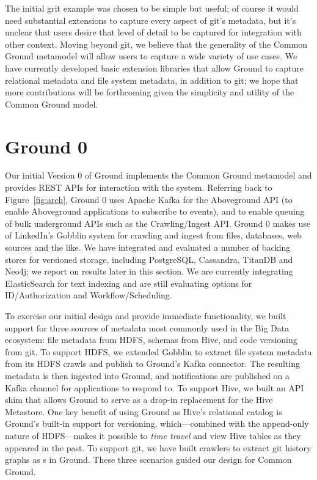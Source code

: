 \documentclass{sig-alternate}
\begin{document}
The initial grit example was chosen to be simple but useful; of course it would need substantial extensions to capture every aspect of git's metadata, but it's unclear that users desire that level of detail to be captured for integration with other context. Moving beyond git, we believe that the generality of the Common Ground metamodel will allow users to capture a wide variety of use cases. We have currently developed basic extension libraries that allow Ground to capture relational metadata and file system metadata, in addition to git; we hope that more contributions will be forthcoming given the simplicity and utility of the Common Ground model.

\section{Ground 0}
\label{sec:prototype}

Our initial Version 0 of Ground implements the Common Ground metamodel and provides REST APIs for interaction with the system. 
Referring back to Figure~\ref{fig:arch}, Ground 0 uses Apache Kafka for the Aboveground API (to enable Aboveground applications to subscribe to events), and to enable queuing of bulk underground APIs such as the Crawling/Ingest API.
Ground 0 makes use of LinkedIn's Gobblin system for crawling and ingest from files, databases, web sources and the like.
We have integrated and evaluated a number of backing stores for versioned storage, including PostgreSQL, Cassandra, TitanDB and Neo4j; we report on results later in this section.
We are currently integrating ElasticSearch for text indexing and are still evaluating options for ID/Authorization and Workflow/Scheduling. 

To exercise our initial design and provide immediate functionality,
we built support for three sources of metadata most commonly used in the Big Data ecosystem: file metadata from HDFS, schemas from Hive, and code versioning from git.
To support HDFS, we extended Gobblin to extract file system metadata from its HDFS crawls and publish to Ground's Kafka connector. The resulting metadata is then ingested into Ground, and notifications are published on a Kafka channel for applications to respond to. To support Hive, we built an API shim that allows Ground to serve as a drop-in replacement for the Hive Metastore.
One key benefit of using Ground as Hive's relational catalog is Ground's built-in support for versioning, which---combined with the append-only nature of HDFS---makes it possible to \emph{time travel} and view Hive tables as they appeared in the past.  To support git, we have built crawlers to extract git history graphs as s in Ground. These three scenarios guided our design for Common Ground.
\end{document}
